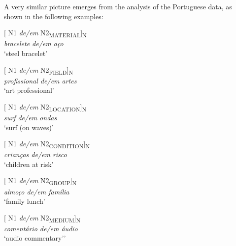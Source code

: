 \documentclass[output=paper]{langsci/langscibook}
\begin{document}
A very similar picture emerges from the analysis of the Portuguese data, as shown in the following examples:

\begin{exe}\ex\begin{minipage}{0.4\textwidth}    %
[ N1 \textit{de/em} N2\textsubscript{MATERIAL}]\textsubscript{N}\\
\textit{bracelete de/em aço}\\
`steel bracelet'
\end{minipage}\hfill%
\begin{minipage}{0.45\textwidth}
[ N1 \textit{de/em} N2\textsubscript{FIELD}]\textsubscript{N}\\
\textit{profissional de/em artes}\\
`art professional'
\end{minipage}
\end{exe}

\begin{exe}\ex\begin{minipage}[t]{0.4\textwidth}    %
[ N1 \textit{de/em} N2\textsubscript{LOCATION}]\textsubscript{N}\\
\textit{surf de/em ondas }\\
`surf (on waves)'
\end{minipage}\hfill            %
\begin{minipage}[t]{0.45\textwidth}
[ N1 \textit{de/em} N2\textsubscript{CONDITION}]\textsubscript{N}\\
\textit{crianças de/em risco}\\
`children at risk'
\end{minipage}\end{exe}

\begin{exe}\ex\begin{minipage}[t]{0.4\textwidth}    %
[ N1 \textit{de/em} N2\textsubscript{GROUP}]\textsubscript{N}\\
\textit{almoço de/em família}\\
`family lunch'
\end{minipage}\hfill%
\begin{minipage}[t]{0.45\textwidth}
[ N1 \textit{de/em} N2\textsubscript{MEDIUM}]\textsubscript{N}\\
\textit{comentário de/em áudio}\\
`audio commentary’'
\end{minipage}\end{exe}
\end{document}
